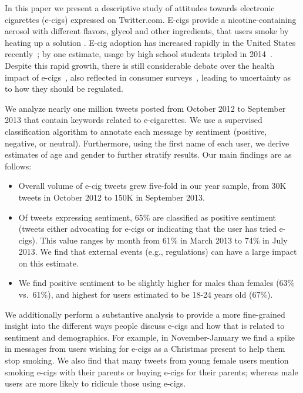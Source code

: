 \documentclass{sig-alternate}
\begin{document}
In this paper we present a descriptive study of attitudes towards electronic
cigarettes (e-cigs) expressed on Twitter.com. E-cigs provide a
nicotine-containing aerosol with different flavors, glycol and other
ingredients, that users smoke by heating up a solution
\cite{grana2014cigarettes}. E-cig adoption has increased rapidly in the United
States recently~\cite{king2013awareness,centers2013notes}; by one estimate,
usage by high school students tripled in 2014~\cite{ecig2015triples}. Despite
this rapid growth, there is still considerable debate over the health impact
of e-cigs~\cite{sussan2015exposure,pauly2007tobacco,bhatnagar2014electronic},
also reflected in consumer surveys~\cite{pepper2015risky}, leading to
uncertainty as to how they should be regulated.

We analyze nearly one million tweets posted from October 2012 to September
2013 that contain keywords related to e-cigarettes. We use a supervised
classification algorithm to annotate each message by sentiment (positive,
negative, or neutral). Furthermore, using the first name of each user, we
derive estimates of age and gender to further stratify results. Our main
findings are as follows:
\begin{itemize}
\item Overall volume of e-cig tweets grew five-fold in our year sample, from
  30K tweets in October 2012 to 150K in September 2013.
\item Of tweets expressing sentiment, 65\% are classified as positive
  sentiment (tweets either advocating for e-cigs or indicating that the user
  has tried e-cigs). This value ranges by month from 61\% in March 2013 to
  74\% in July 2013. We find that external events (e.g., regulations) can have
  a large impact on this estimate.
\item We find positive sentiment to be slightly higher for males than females
  (63\% vs.~61\%), and highest for users estimated to be 18-24 years old (67\%).
\end{itemize}

We additionally perform a substantive analysis to provide a more fine-grained
insight into the different ways people discuss e-cigs and how that is related
to sentiment and demographics. For example, in November-January we find a
spike in messages from users wishing for e-cigs as a Christmas present to help
them stop smoking. We also find that many tweets from young female users
mention smoking e-cigs with their parents or buying e-cigs for their parents;
whereas male users are more likely to ridicule those using e-cigs.
\end{document}
